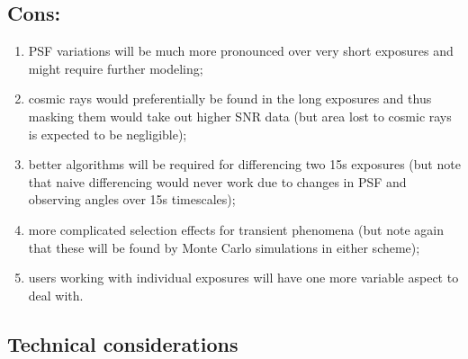 \documentclass[12pt, a4paper]{article}
\begin{document}
\subsection*{Cons:}

\begin{enumerate}

\item PSF variations will be much more pronounced over very short
  exposures and might require further modeling;

\item cosmic rays would preferentially be found in the long exposures and
  thus masking them would take out higher SNR data (but
  area lost to cosmic rays is expected to be negligible);

\item better algorithms will be required for differencing two 15s
  exposures (but note that naive differencing would never work due to
  changes in PSF and observing angles over 15s timescales);

\item more complicated selection effects for transient phenomena (but
  note again that these will be found by Monte Carlo simulations in either scheme);

\item users working with individual exposures will have one more
  variable aspect to deal with.

\end{enumerate}

\subsection*{Technical considerations}
\end{document}
